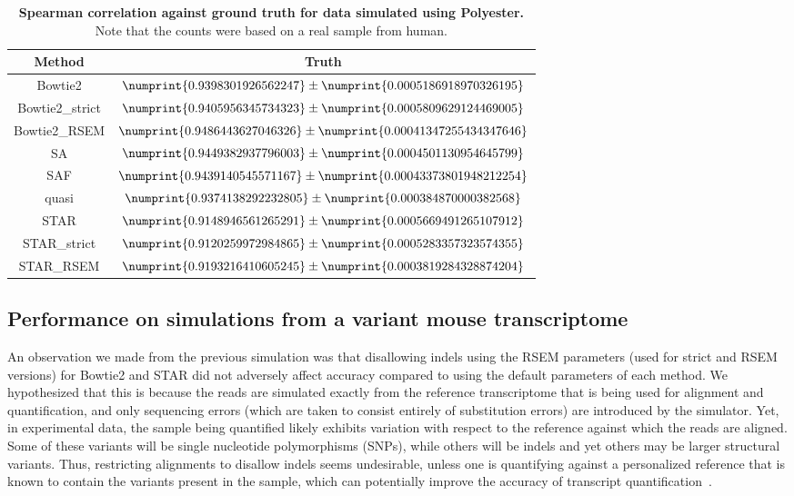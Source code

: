 \begin{table}[h!]
 \centering
 \begin{tabular}{cc}
   \hline
   Method & Truth \\
   \hline
Bowtie2 & $\numprint{0.9398301926562247} \pm \numprint{0.0005186918970326195}$ \\
Bowtie2\_strict & $\numprint{0.9405956345734323} \pm \numprint{0.0005809629124469005}$ \\
Bowtie2\_RSEM & $\numprint{0.9486443627046326} \pm \numprint{0.00041347255434347646}$ \\
SA & $\numprint{0.9449382937796003} \pm \numprint{0.0004501130954645799}$ \\
SAF & $\numprint{0.9439140545571167} \pm \numprint{0.00043373801948212254}$ \\
quasi & $\numprint{0.9374138292232805} \pm \numprint{0.000384870000382568}$ \\
STAR & $\numprint{0.9148946561265291} \pm \numprint{0.0005669491265107912}$ \\
STAR\_strict & $\numprint{0.9120259972984865} \pm \numprint{0.0005283357323574355}$ \\
STAR\_RSEM & $\numprint{0.9193216410605245} \pm \numprint{0.0003819284328874204}$ \\
 \hline
\end{tabular}
 \caption{\textbf{Spearman correlation against ground truth for data simulated using Polyester.} Note that the
 counts were based on a real sample from human.}
 \label{tab:swim}
\end{table}


\subsection{Performance on simulations from a variant mouse transcriptome}
\label{subsec:variant_sim}

An observation we made from the previous simulation was that disallowing
indels using the RSEM parameters (used for strict and RSEM versions) for Bowtie2 and STAR 
did not adversely affect accuracy compared to using the default parameters of each method.
We hypothesized that this is because the reads are simulated exactly from the
reference transcriptome that is being used for alignment and quantification, and
only sequencing errors (which are taken to consist entirely of substitution
errors) are introduced by the simulator. Yet, in experimental data,
the sample being quantified likely exhibits variation with respect to the
reference against which the reads are aligned. Some of these variants will be
single nucleotide polymorphisms (SNPs), while others will be indels and yet
others may be larger structural variants. Thus, restricting alignments to disallow
indels seems undesirable, unless one is quantifying
against a personalized reference that is known to contain the variants present
in the sample, which can potentially improve the accuracy of transcript
quantification~\cite{munger2014rna, makemickhappy}.

